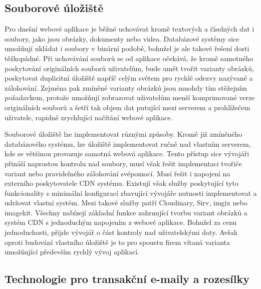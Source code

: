 	\subsection{Souborové úložiště}

	Pro dnešní webové aplikace je běžné uchovávat kromě textových a číselných dat i soubory, jako jsou
	obrázky, dokumenty nebo videa.
	Databázové systémy sice umožňují ukládat i soubory v binární podobě, bohužel je ale takové řešení dosti
	těžkopádné.
	Při uchovávání souborů se od aplikace očekává, že kromě samotného poskytování originálních souborů uživatelům, bude umět tvořit
	varianty obrázků, poskytovat duplicitní úložiště napříč celým světem pro rychlé odezvy nazývané  a zálohování.
	Zejména pak zmíněné varianty obrázků jsou mnohdy tím stěžejním požadavkem, protože umožňují zobrazovat uživatelům menší
	komprimované verze originálních souborů a šetří tak objem dat putující mezi serverem a prohlížečem uživatele, rapidně
	zrychlující načítání webové aplikace.

	Souborové úložiště lze implementovat různými způsoby.
	Kromě již zmíněného databázového systému, lze úložiště implementovat ručně nad vlastním serverem, kde se většinou
	provozuje samotná webová aplikace.
	Tento přístup sice vývojáři přináší naprostou kontrolu nad soubory, musí však řešit implementaci tvořiče variant
	nebo pravidelného zálohování svépomocí.
	Musí řešit i napojení na externího poskytovatele \noindent\Ac{CDN} systému.
	Existují však služby poskytující tyto funkcionality s minimální konfigurací zbavující vývojáře nutnosti implementovat
	a udržovat vlastní systém.
	Mezi takové služby patří Cloudinary, Sirv, imgix nebo imagekit.
	Všechny nabízejí základní funkce zahrnující tvorbu variant obrázků a systém \Ac{CDN} s jednoduchým napojením
	z webové aplikace.
	Bohužel za cenu jednoduchosti, přijde vývojář o část kontroly nad uživatelskými daty.
	Avšak oproti budování vlastního úložiště je to pro spoustu firem vítaná varianta umožňující především rychlý vývoj
	aplikací.

	\subsection{Technologie pro transakční e-maily a rozesílky}

